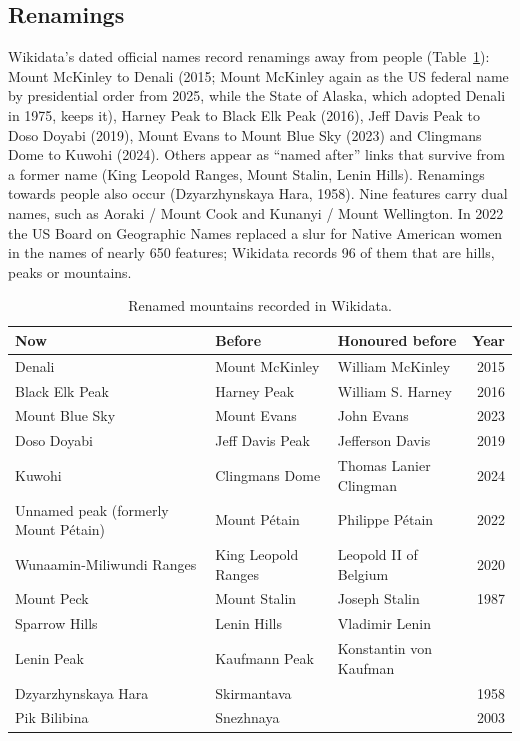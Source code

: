 \documentclass[11pt,a4paper]{article}
\begin{document}
\subsection{Renamings}
Wikidata's dated official names record renamings away from people (Table~\ref{tab:ren}): Mount McKinley to Denali (2015; Mount McKinley again as the US federal name by presidential order from 2025, while the State of Alaska, which adopted Denali in 1975, keeps it), Harney Peak to Black Elk Peak (2016), Jeff Davis Peak to Doso Doyabi (2019), Mount Evans to Mount Blue Sky (2023) and Clingmans Dome to Kuwohi (2024). Others appear as ``named after'' links that survive from a former name (King Leopold Ranges, Mount Stalin, Lenin Hills). Renamings towards people also occur (Dzyarzhynskaya Hara, 1958). Nine features carry dual names, such as Aoraki / Mount Cook and Kunanyi / Mount Wellington. In 2022 the US Board on Geographic Names replaced a slur for Native American women in the names of nearly 650 features; Wikidata records 96 of them that are hills, peaks or mountains.

\begin{table}[tbp]\centering\small\caption{Renamed mountains recorded in Wikidata.}\label{tab:ren}\begin{tabular}{p{4.2cm}p{3.6cm}p{3.6cm}r}\toprule Now & Before & Honoured before & Year\\\midrule
Denali & Mount McKinley & William McKinley & 2015\\
Black Elk Peak & Harney Peak & William S. Harney & 2016\\
Mount Blue Sky & Mount Evans & John Evans & 2023\\
Doso Doyabi & Jeff Davis Peak & Jefferson Davis & 2019\\
Kuwohi & Clingmans Dome & Thomas Lanier Clingman & 2024\\
Unnamed peak (formerly Mount Pétain) & Mount Pétain & Philippe Pétain & 2022\\
Wunaamin-Miliwundi Ranges & King Leopold Ranges & Leopold II of Belgium & 2020\\
Mount Peck & Mount Stalin & Joseph Stalin & 1987\\
Sparrow Hills & Lenin Hills & Vladimir Lenin & \\
Lenin Peak & Kaufmann Peak & Konstantin von Kaufman & \\
Dzyarzhynskaya Hara & Skirmantava &  & 1958\\
Pik Bilibina & Snezhnaya &  & 2003\\
\bottomrule\end{tabular}\end{table}
\end{document}
